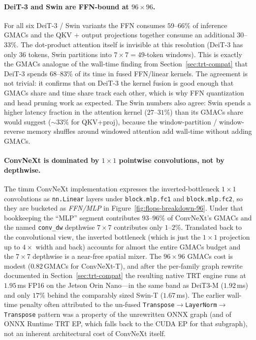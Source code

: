 \documentclass[runningheads,a4paper]{llncs}
\begin{document}
\paragraph{DeiT-3 and Swin are FFN-bound at $96\times96$.}
For all six DeiT-3 / Swin variants the FFN consumes $59$--$66\%$ of inference GMACs and the QKV $+$ output projections together consume an additional $30$--$33\%$. The dot-product attention itself is invisible at this resolution (DeiT-3 has only $36$ tokens, Swin partitions into $7\times7=49$-token windows). This is exactly the GMACs analogue of the wall-time finding from Section~\ref{sec:trt-compat} that DeiT-3 spends $68$--$83\%$ of its time in fused FFN/linear kernels. The agreement is not trivial: it confirms that on DeiT-3 the kernel fusion is good enough that GMACs share and time share track each other, which is why FFN quantization and head pruning work as expected. The Swin numbers also agree: Swin spends a higher latency fraction in the attention kernel ($27$--$31\%$) than its GMACs share would suggest ($\sim$$33\%$ for QKV+proj), because the window-partition / window-reverse memory shuffles around windowed attention add wall-time without adding GMACs.

\paragraph{ConvNeXt is dominated by $1\times1$ pointwise convolutions, not by depthwise.}
The timm ConvNeXt implementation expresses the inverted-bottleneck $1\times1$ convolutions as \texttt{nn.Linear} layers under \texttt{block.mlp.fc1} and \texttt{block.mlp.fc2}, so they are bucketed as \emph{FFN/MLP} in Figure~\ref{fig:flops-breakdown-96}. Under that bookkeeping the ``MLP'' segment contributes $93$--$96\%$ of ConvNeXt's GMACs and the named \texttt{conv\_dw} depthwise $7\times7$ contributes only $1$--$2\%$. Translated back to the convolutional view, the inverted bottleneck (which is just the $1\times1$ projection up to $4\times$ width and back) accounts for almost the entire GMACs budget and the $7\times7$ depthwise is a near-free spatial mixer. The $96\times96$ GMACs cost is modest ($0.82$\,GMACs for ConvNeXt-T), and after the per-family graph rewrite documented in Section~\ref{sec:trt-compat} the resulting native TRT engine runs at $1.95$\,ms FP16 on the Jetson Orin Nano---in the same band as DeiT3-M ($1.92$\,ms) and only $17\%$ behind the comparably sized Swin-T ($1.67$\,ms). The earlier wall-time penalty often attributed to the un-fused \texttt{Transpose$\to$LayerNorm$\to$Transpose} pattern was a property of the unrewritten ONNX graph (and of ONNX Runtime TRT EP, which falls back to the CUDA EP for that subgraph), not an inherent architectural cost of ConvNeXt itself.
\end{document}
